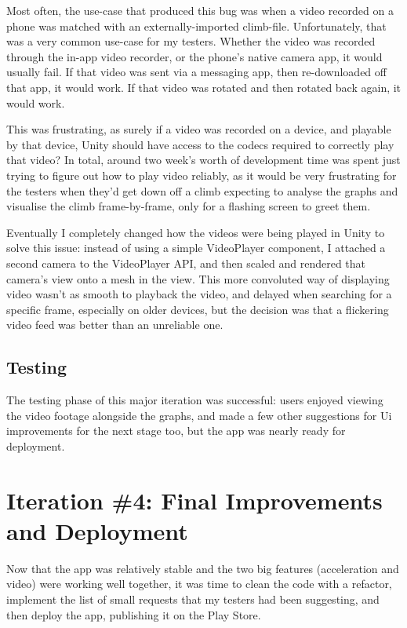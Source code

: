 Most often, the use-case that produced this bug was when a video recorded on a phone was matched with an externally-imported climb-file.
Unfortunately, that was a very common use-case for my testers.
Whether the video was recorded through the in-app video recorder, or the phone's native camera app, it would usually fail.
If that video was sent via a messaging app, then re-downloaded off that app, it would work.
If that video was rotated and then rotated back again, it would work.

This was frustrating, as surely if a video was recorded on a device, and playable by that device, Unity should have access to the codecs required to correctly play that video?
In total, around two week's worth of development time was spent just trying to figure out how to play video reliably, as it would be very frustrating for the testers when they'd get down off a climb expecting to analyse the graphs and visualise the climb frame-by-frame, only for a flashing screen to greet them.

Eventually I completely changed how the videos were being played in Unity to solve this issue: instead of using a simple VideoPlayer component, I attached a second camera to the VideoPlayer API, and then scaled and rendered that camera's view onto a mesh in the view.
This more convoluted way of displaying video wasn't as smooth to playback the video, and delayed when searching for a specific frame, especially on older devices, but the decision was that a flickering video feed was better than an unreliable one.




\subsection{Testing}
The testing phase of this major iteration was successful: users enjoyed viewing the video footage alongside the graphs, and made a few other suggestions for Ui improvements for the next stage too, but the app was nearly ready for deployment.




\section{Iteration \#4: Final Improvements and Deployment}
Now that the app was relatively stable and the two big features (acceleration and video) were working well together, it was time to clean the code with a refactor, implement the list of small requests that my testers had been suggesting, and then deploy the app, publishing it on the Play Store.

